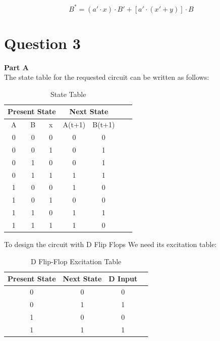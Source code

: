 \documentclass[table ]{article}
\begin{document}
    \begin{equation}
        B^* = (a' \cdot x) \cdot B' + [a' \cdot (x' + y)] \cdot B
    \end{equation}
    
    
\newpage



\section*{Question 3}

\textbf{Part A} \\


The state table for the requested circuit can be written as follows:

    
\begin{table}[H]
    \centering
    \caption{State Table}

    \begin{tabular}{|c|c|c|c|c|c|c|}
        \hline
        \multicolumn{3}{|c|}{Present State} & \multicolumn{2}{c|}{Next State} \\
        \hline
        A & B & x & A(t+1) & B(t+1)  \\
        \hline
        0 & 0 & 0 & 0 & 0 \\
        0 & 0 & 1 & 0 & 1 \\
        \hline
        0 & 1 & 0 & 0 & 1 \\
        0 & 1 & 1 & 1 & 1 \\
        \hline
        1 & 0 & 0 & 1 & 0 \\
        1 & 0 & 1 & 0 & 0 \\
        \hline
        1 & 1 & 0 & 1 & 1 \\
        1 & 1 & 1 & 1 & 0 \\
        \hline
\end{tabular}
\end{table}


To design the circuit with D Flip Flops We need its excitation table:

\begin{table}[H]
    \centering
    \caption{D Flip-Flop Excitation Table}
    \begin{tabular}{|c|c|c|c|}
        \hline
        Present State & Next State & D Input \\
        \hline
        0 & 0 & 0 \\
        0 & 1 & 1 \\
        1 & 0 & 0 \\
        1 & 1 & 1 \\
        \hline
    \end{tabular}
\end{table}
\end{document}
